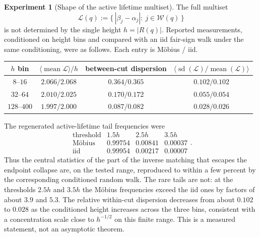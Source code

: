 \documentclass[11pt]{amsart}
\numberwithin{equation}{section}
\theoremstyle{plain}
\theoremstyle{definition}
\newtheorem{experiment}[theorem]{Experiment}
\theoremstyle{remark}
\begin{document}
\begin{experiment}[Shape of the active lifetime multiset]
\label{exp:active-lifetime-shape}
The full multiset
\begin{equation}
\label{eq:active-lifetime-multiset}
\mathcal L(q):=
\bigl\{\,|\beta_j-\alpha_j|:\ j\in\mathcal W(q)\,\bigr\}
\end{equation}
is not determined by the single height $h=|R(q)|$.  Reported measurements,
conditioned on height bins and compared with an iid fair-sign walk under the same
conditioning, were as follows.  Each entry is M\"obius / iid.
\begin{center}
\begin{tabular}{@{}cccc@{}}
\toprule
$h$ bin
& $\langle\operatorname{mean}\mathcal L\rangle/h$
& between-cut dispersion
& $\langle\operatorname{sd}(\mathcal L)/\operatorname{mean}(\mathcal L)\rangle$\\
\midrule
$8$--$16$   & $2.066/2.068$ & $0.364/0.365$ & $0.102/0.102$\\
$32$--$64$  & $2.010/2.025$ & $0.170/0.172$ & $0.055/0.054$\\
$128$--$400$& $1.997/2.000$ & $0.087/0.082$ & $0.028/0.026$\\
\bottomrule
\end{tabular}
\end{center}
The regenerated active-lifetime tail frequencies were
\begin{equation}
\label{eq:active-lifetime-tail-measured}
\begin{array}{c|ccc}
\text{threshold}&1.5h&2.5h&3.5h\\ \hline
\text{M\"obius}&0.99754&0.00841&0.00037\\
\text{iid}&0.99954&0.00217&0.00007
\end{array}.
\end{equation}
Thus the central statistics of the part of the inverse matching that escapes the
endpoint collapse are, on the tested range, reproduced to within a few percent by
the corresponding conditioned random walk.  The rare tails are not: at the
thresholds $2.5h$ and $3.5h$ the M\"obius frequencies exceed the iid ones by
factors of about $3.9$ and $5.3$.  The relative within-cut dispersion decreases from
about $0.102$ to $0.028$ as the conditioned height increases across the three
bins, consistent with a concentration scale close to $h^{-1/2}$ on this finite
range.
This is a measured statement, not an asymptotic theorem.
\end{experiment}
\end{document}
